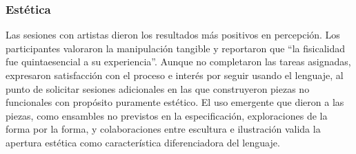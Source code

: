 \subsubsection{Est\'etica}
Las sesiones con artistas dieron los resultados m\'as positivos en
percepci\'on. Los participantes valoraron la manipulaci\'on tangible
y reportaron que ``la fisicalidad fue quintaesencial a su
experiencia''. Aunque no completaron las tareas asignadas,
expresaron satisfacci\'on con el proceso e inter\'es por seguir
usando el lenguaje, al punto de solicitar sesiones adicionales en
las que construyeron piezas no funcionales con prop\'osito
puramente est\'etico. El uso emergente que dieron a las piezas, como
ensambles no previstos en la especificaci\'on, exploraciones
de la forma por la forma, y colaboraciones entre escultura e ilustración valida la apertura est\'etica como
caracter\'istica diferenciadora del lenguaje.

\endinput
